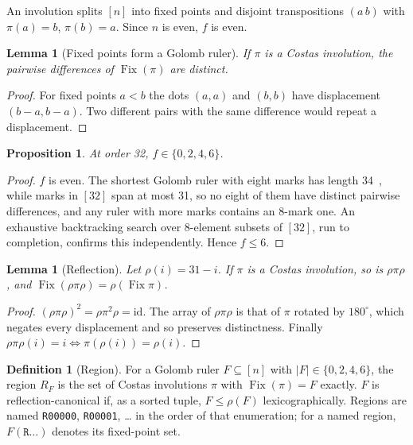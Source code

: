 \documentclass[11pt,a4paper,oneside]{report}
\newtheorem{proposition}[theorem]{Proposition}
\newtheorem{lemma}[theorem]{Lemma}
\theoremstyle{definition}
\newtheorem{definition}[theorem]{Definition}
\newcommand{\Fix}{\operatorname{Fix}}
\newcommand{\code}[1]{\texttt{#1}}
\begin{document}
An involution splits $[n]$ into fixed points and disjoint transpositions $(a\,b)$ with
$\pi(a)=b$, $\pi(b)=a$. Since $n$ is even, $f$ is even.

\begin{lemma}[Fixed points form a Golomb ruler]\label{p8-lem:golomb}
If $\pi$ is a Costas involution, the pairwise differences of $\Fix(\pi)$ are distinct.
\end{lemma}
\begin{proof}
For fixed points $a<b$ the dots $(a,a)$ and $(b,b)$ have displacement $(b-a,b-a)$. Two
different pairs with the same difference would repeat a displacement.
\end{proof}

\begin{proposition}\label{p8-prop:f}
At order 32, $f\in\{0,2,4,6\}$.
\end{proposition}
\begin{proof}
$f$ is even. The shortest Golomb ruler with eight marks has length 34~\cite{p8-oeisgolomb}, while
marks in $[32]$ span at most 31, so no eight of them have distinct pairwise differences, and any
ruler with more marks contains an 8-mark one. An exhaustive backtracking search over 8-element
subsets of $[32]$, run to completion, confirms this independently. Hence $f\le 6$.
\end{proof}

\begin{lemma}[Reflection]\label{p8-lem:refl}
Let $\rho(i)=31-i$. If $\pi$ is a Costas involution, so is $\rho\pi\rho$, and
$\Fix(\rho\pi\rho)=\rho(\Fix\pi)$.
\end{lemma}
\begin{proof}
$(\rho\pi\rho)^2=\rho\pi^2\rho=\mathrm{id}$. The array of $\rho\pi\rho$ is that of $\pi$
rotated by $180^\circ$, which negates every displacement and so preserves distinctness.
Finally $\rho\pi\rho(i)=i\iff\pi(\rho(i))=\rho(i)$.
\end{proof}

\begin{definition}[Region]
For a Golomb ruler $F\subseteq[n]$ with $|F|\in\{0,2,4,6\}$, the region $R_F$ is the set of
Costas involutions $\pi$ with $\Fix(\pi)=F$ exactly. $F$ is reflection-canonical if,
as a sorted tuple, $F\le\rho(F)$ lexicographically. Regions are named \code{R00000},
\code{R00001}, \dots{} in the order of that enumeration; for a named region,
$F(\code{R}\ldots)$ denotes its fixed-point set.
\end{definition}
\end{document}
